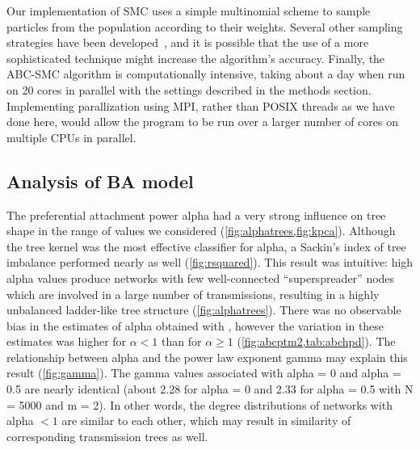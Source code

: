 Our implementation of \gls{SMC} uses a simple multinomial scheme to sample
particles from the population according to their weights. Several other
sampling strategies have been developed~\autocite{douc2005comparison}, and it
is possible that the use of a more sophisticated technique might increase the
algorithm's accuracy. Finally, the \gls{ABC}-\gls{SMC} algorithm is
computationally intensive, taking about a day when run on 20 cores in parallel
with the settings described in the methods section. Implementing parallization
using MPI, rather than POSIX threads as we have done here, would allow the
program to be run over a larger number of cores on multiple CPUs in parallel.

\subsection{Analysis of \acrlong{BA} model}

The preferential attachment power \gls{alpha} had a very strong influence on
tree shape in the range of values we considered
(\cref{fig:alphatrees,fig:kpca}). Although the tree kernel was the most
effective classifier for \gls{alpha}, a Sackin's index of tree imbalance
performed nearly as well (\cref{fig:rsquared}). This result was intuitive: high
\gls{alpha} values produce networks with few well-connected ``superspreader''
nodes which are involved in a large number of transmissions, resulting in a
highly unbalanced ladder-like tree structure (\cref{fig:alphatrees}). 
There was no observable bias in the estimates of \gls{alpha} obtained with
, however the variation in these estimates was higher for
$\alpha < 1$ than for $\alpha \geq 1$ (\cref{fig:abcptm2,tab:abchpd}). The
relationship between \gls{alpha} and the power law exponent \gls{gamma} may
explain this result (\cref{fig:gamma}). The \gls{gamma} values associated with
\gls{alpha} = 0 and \gls{alpha} = 0.5 are nearly identical (about 2.28 for
\gls{alpha} = 0 and 2.33 for \gls{alpha} = 0.5 with \gls{N} = 5000 and \gls{m}
= 2). In other words, the degree distributions of networks with \gls{alpha} $<
1$ are similar to each other, which may result in similarity of corresponding
transmission trees as well. 

